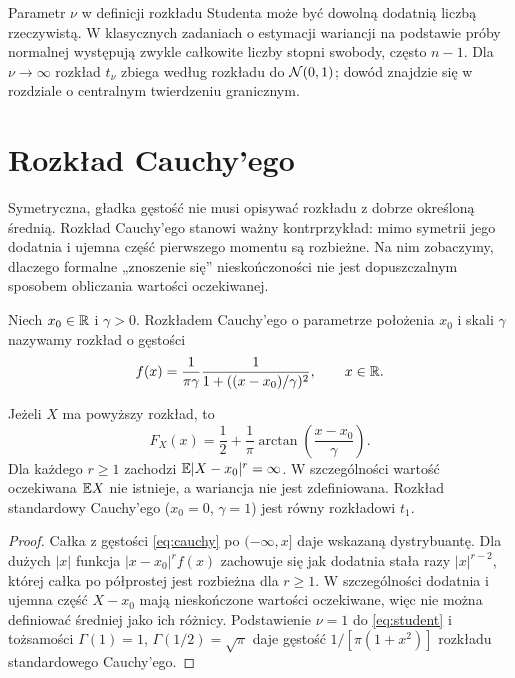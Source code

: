 \begin{uwaga}
Parametr $\nu$ w definicji rozkładu Studenta może być dowolną
dodatnią liczbą rzeczywistą. W klasycznych zadaniach o estymacji
wariancji na podstawie próby normalnej występują zwykle całkowite
liczby stopni swobody, często $n-1$.
Dla $\nu\to\infty$ rozkład $t_\nu$ zbiega według rozkładu
do $\mathcal{N}(0,1)$; dowód znajdzie się w rozdziale
o centralnym twierdzeniu granicznym.
\end{uwaga}

\section{Rozkład Cauchy'ego}
Symetryczna, gładka gęstość nie musi opisywać rozkładu z dobrze
określoną średnią. Rozkład Cauchy'ego stanowi ważny kontrprzykład:
mimo symetrii jego dodatnia i ujemna część pierwszego momentu
są rozbieżne. Na nim zobaczymy, dlaczego formalne „znoszenie się”
nieskończoności nie jest dopuszczalnym sposobem obliczania
wartości oczekiwanej.

\begin{definicja}
Niech $x_0\in\mathbb{R}$ i $\gamma>0$. Rozkładem Cauchy'ego
o parametrze położenia $x_0$ i skali $\gamma$
nazywamy rozkład o gęstości
\begin{equation}\label{eq:cauchy}
f(x)=\frac1{\pi\gamma}
\frac{1}{1+((x-x_0)/\gamma)^2},\qquad x\in\mathbb{R}.
\end{equation}
\end{definicja}

\begin{stwierdzenie}
Jeżeli $X$ ma powyższy rozkład, to
\[
F_X(x)=\frac12+\frac1\pi
\arctan\!\left(\frac{x-x_0}{\gamma}\right).
\]
Dla każdego $r\geq1$ zachodzi $\mathbb{E}|X-x_0|^r=\infty$.
W szczególności wartość oczekiwana $\mathbb{E} X$ nie istnieje,
a wariancja nie jest zdefiniowana.
Rozkład standardowy Cauchy'ego ($x_0=0$, $\gamma=1$)
jest równy rozkładowi $t_1$.
\end{stwierdzenie}
\begin{proof}
Całka z gęstości \eqref{eq:cauchy} po $(-\infty,x]$
daje wskazaną dystrybuantę.
Dla dużych $|x|$ funkcja $|x-x_0|^r f(x)$
zachowuje się jak dodatnia stała razy $|x|^{r-2}$,
której całka po półprostej jest rozbieżna dla $r\geq1$.
W szczególności dodatnia i ujemna część
$X-x_0$ mają nieskończone wartości oczekiwane,
więc nie można definiować średniej jako ich różnicy.
Podstawienie $\nu=1$ do \eqref{eq:student} i tożsamości
$\Gamma(1)=1$, $\Gamma(1/2)=\sqrt\pi$ daje gęstość
$1/[\pi(1+x^2)]$ rozkładu standardowego Cauchy'ego.
\end{proof}

